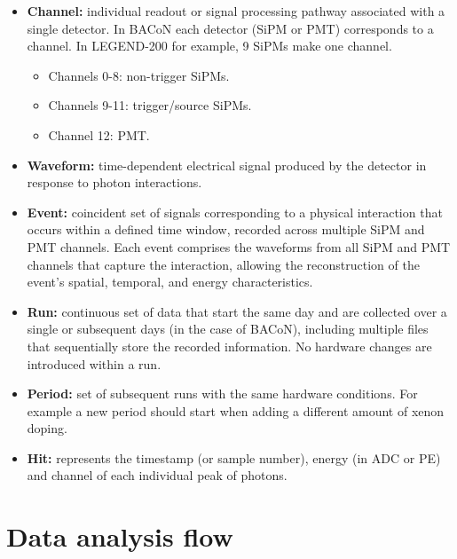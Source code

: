\documentclass[11pt,a4paper,english,oneside, pdf]{article}
\begin{document}
	 \begin{itemize}
	 	\item \textbf{Channel:}  individual readout or signal processing pathway associated with a single detector. In BACoN each detector (SiPM or PMT) corresponds to a channel. In LEGEND-200 for example, 9 SiPMs make one channel.
	 	\begin{itemize}
	 		\item Channels 0-8: non-trigger SiPMs.
	 		\item Channels 9-11: trigger/source SiPMs.
	 		\item Channel 12: PMT.
	 	\end{itemize}
	 	
	 	\item \textbf{Waveform:} time-dependent electrical signal produced by the detector in response to photon interactions.
	 	
	 	\item \textbf{Event:} coincident set of signals corresponding to a physical interaction that occurs within a defined time window, recorded across multiple SiPM and PMT channels. Each event comprises the waveforms from all SiPM and PMT channels that capture the interaction, allowing the reconstruction of the event's spatial, temporal, and energy characteristics.
	 	
	 	\item \textbf{Run:} continuous set of data that start the same day and are collected over a single or subsequent days (in the case of BACoN), including multiple files that sequentially store the recorded information. No hardware changes are introduced within a run.
	 	
	 	\item \textbf{Period:} set of subsequent runs with the same hardware conditions. For example a new period should start when adding a different amount of xenon doping.
	 	
	 	\item \textbf{Hit:} represents the timestamp (or sample number), energy (in ADC or PE) and channel of each individual peak of photons.
	 \end{itemize}
	  
	 
	
	\clearpage
	
	\section{Data analysis flow}
	\label{data_analysis_flow_sec}
	
\end{document}

